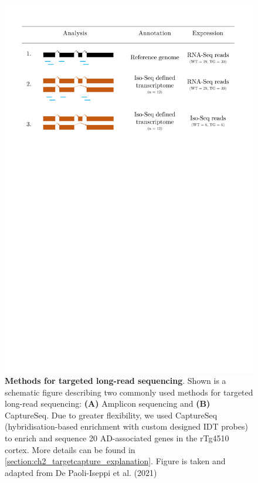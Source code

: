 \begin{figure}[htp]
	\centering
	\includegraphics[page=6,trim={1cm 40cm 1cm 0cm},clip,scale = 0.5]{Figures/Tg4510_diff_figures.pdf}
	\captionsetup{width=0.95\textwidth}
	\caption[Methods for targeted sequencing]%
	{\textbf{Methods for targeted long-read sequencing}. Shown is a schematic figure describing two commonly used methods for targeted long-read sequencing: \textbf{(A)} Amplicon sequencing and \textbf{(B)} CaptureSeq. Due to greater flexibility, we used CaptureSeq (hybridisation-based enrichment with custom designed IDT probes) to enrich and sequence 20 AD-associated genes in the rTg4510 cortex. More details can be found in \cref{section:ch2_targetcapture_explanation}. Figure is taken and adapted from De Paoli-Iseppi et al. (2021) \cite{DePaoli-Iseppi2021}}
	\label{fig:targeted_sequencing_method}
\end{figure}

